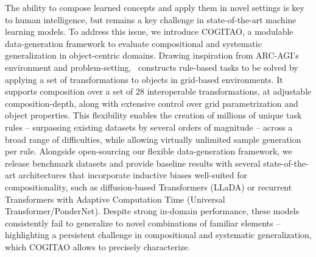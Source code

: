 The ability to compose learned concepts and apply them in novel settings is key to human intelligence, but remains a key challenge in state-of-the-art machine learning models.
%
To address this issue, we introduce COGITAO, a modulable data-generation framework to evaluate compositional and systematic generalization in object-centric domains.
%
Drawing inspiration from ARC-AGI's environment and problem-setting, \generatorName\ constructs rule-based tasks to be solved by applying a set of transformations to objects in grid-based environments. 
%
It supports composition over a set of $28$ interoperable transformations, at adjustable composition-depth, along with extensive control over grid parametrization and object properties. 
%
This flexibility enables the creation of millions of unique task rules -- surpassing existing datasets by several orders of magnitude -- across a broad range of difficulties, while allowing virtually unlimited sample generation per rule.
%
Alongside open-sourcing our flexible data-generation framework, we release benchmark datasets and provide baseline results with several state-of-the-art architectures that incorporate inductive biases well-suited for compositionality, such as diffusion-based Transformers (LLaDA) or recurrent Transformers with Adaptive Computation Time (Universal Transformer/PonderNet).
%
Despite strong in-domain performance, these models consistently fail to generalize to novel combinations of familiar elements -- highlighting a persistent challenge in compositional and systematic generalization, which COGITAO allows to precisely characterize.  
%
